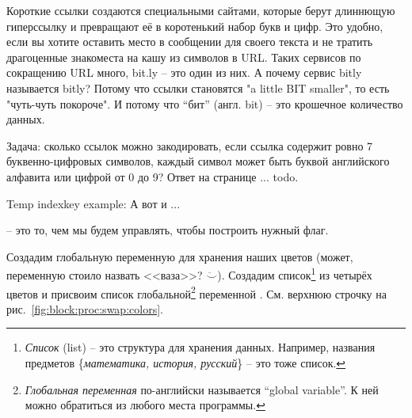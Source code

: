 \begin{mdframed}[nobreak=true]
\sloppy %
    Короткие ссылки создаются специальными сайтами, которые берут длиннющую 
    гиперссылку и превращают её в коротенький набор букв и цифр. Это удобно, 
    если вы хотите оставить место в сообщении для своего текста и 
    не тратить драгоценные знакоместа на кашу из символов в URL.  
    Таких сервисов по сокращению URL много, bit.ly -- это один из них. 
    А почему сервис bitly называется bitly? Потому что ссылки становятся "a little BIT smaller", то есть "чуть-чуть покороче". 
    И потому что ``бит'' (англ. bit) -- это крошечное количество данных. 
\end{mdframed}



Задача: сколько ссылок можно закодировать, 
        если ссылка содержит ровно 7 буквенно-цифровых символов,
        каждый символ может быть буквой английского алфавита 
        или цифрой от 0 до 9? Ответ на странице ... todo.

Temp indexkey example: А вот и ...

 -- это то, чем мы будем управлять, 
чтобы построить нужный флаг. 

Создадим глобальную переменную  для хранения наших цветов 
(может, переменную стоило назвать <<ваза>>? $\ddot\smile$). 
Создадим список\footnote[][-2cm]{\emph{Список} (list) -- это структура для хранения данных. 
Например, названия предметов \{\emph{математика, история, русский}\} -- это тоже список.
} 
из четырёх цветов и присвоим список глобальной\footnote[][-0cm]{
    \emph{Глобальная переменная} по-английски 
    называется ``global variable''. К ней можно обратиться из любого места программы. 
    }
переменной . См. верхнюю строчку на рис.~\ref{fig:block:proc:swap:colors}.

